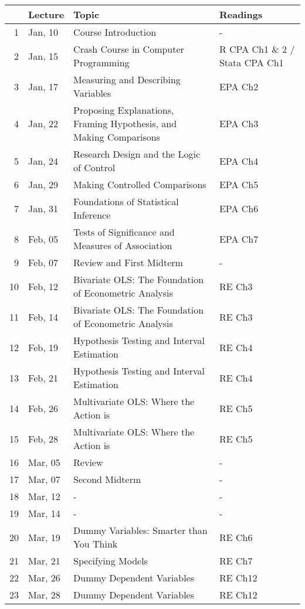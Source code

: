 \begin{table}[ht]
\centering
\begin{tabular}{rlll}
  \hline
 & Lecture & Topic & Readings \\ 
  \hline
1 & Jan, 10 & Course Introduction & - \\ 
  2 & Jan, 15 & Crash Course in Computer Programming & R CPA Ch1 \& 2 / Stata CPA Ch1 \\ 
  3 & Jan, 17 & Measuring and Describing Variables & EPA Ch2 \\ 
  4 & Jan, 22 & Proposing Explanations, Framing Hypothesis, and Making Comparisons & EPA Ch3 \\ 
  5 & Jan, 24 & Research Design and the Logic of Control & EPA Ch4 \\ 
  6 & Jan, 29 & Making Controlled Comparisons & EPA Ch5 \\ 
  7 & Jan, 31 & Foundations of Statistical Inference & EPA Ch6 \\ 
  8 & Feb, 05 & Tests of Significance and Measures of Association & EPA Ch7 \\ 
  9 & Feb, 07 & Review and First Midterm & - \\ 
  10 & Feb, 12 & Bivariate OLS: The Foundation of Econometric Analysis & RE Ch3 \\ 
  11 & Feb, 14 & Bivariate OLS: The Foundation of Econometric Analysis & RE Ch3 \\ 
  12 & Feb, 19 & Hypothesis Testing and Interval Estimation & RE Ch4 \\ 
  13 & Feb, 21 & Hypothesis Testing and Interval Estimation & RE Ch4 \\ 
  14 & Feb, 26 & Multivariate OLS: Where the Action is & RE Ch5 \\ 
  15 & Feb, 28 & Multivariate OLS: Where the Action is & RE Ch5 \\ 
  16 & Mar, 05 & Review & - \\ 
  17 & Mar, 07 & Second Midterm & - \\ 
  18 & Mar, 12 & - & - \\ 
  19 & Mar, 14 & - & - \\ 
  20 & Mar, 19 & Dummy Variables: Smarter than You Think & RE Ch6 \\ 
  21 & Mar, 21 & Specifying Models & RE Ch7 \\ 
  22 & Mar, 26 & Dummy Dependent Variables & RE Ch12 \\ 
  23 & Mar, 28 & Dummy Dependent Variables & RE Ch12 \\ 

\end{tabular}
\end{table}
